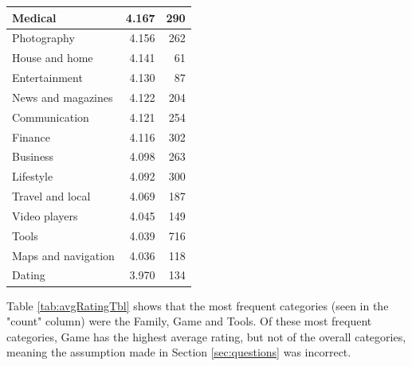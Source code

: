 \documentclass[12pt]{report}\usepackage[]{graphicx}\usepackage[]{xcolor}
\newenvironment{knitrout}{}{} %
\begin{document}
\begin{knitrout}
\begin{table}[H]
\begin{tabular}[t]{l|r|r}
\hline
Medical & 4.167 & 290\\
\hline
Photography & 4.156 & 262\\
\hline
House and home & 4.141 & 61\\
\hline
Entertainment & 4.130 & 87\\
\hline
News and magazines & 4.122 & 204\\
\hline
Communication & 4.121 & 254\\
\hline
Finance & 4.116 & 302\\
\hline
Business & 4.098 & 263\\
\hline
Lifestyle & 4.092 & 300\\
\hline
Travel and local & 4.069 & 187\\
\hline
Video players & 4.045 & 149\\
\hline
Tools & 4.039 & 716\\
\hline
Maps and navigation & 4.036 & 118\\
\hline
Dating & 3.970 & 134\\
\hline
\end{tabular}
\end{table}

\end{knitrout}
\normalsize

Table \ref{tab:avgRatingTbl} shows that the most frequent categories (seen in the "count" column) were
the Family, Game and Tools. Of these most frequent categories, Game has the highest average rating, but 
not of the overall categories, meaning the assumption made in Section \ref{sec:questions} was incorrect.

\pagebreak
\end{document}
